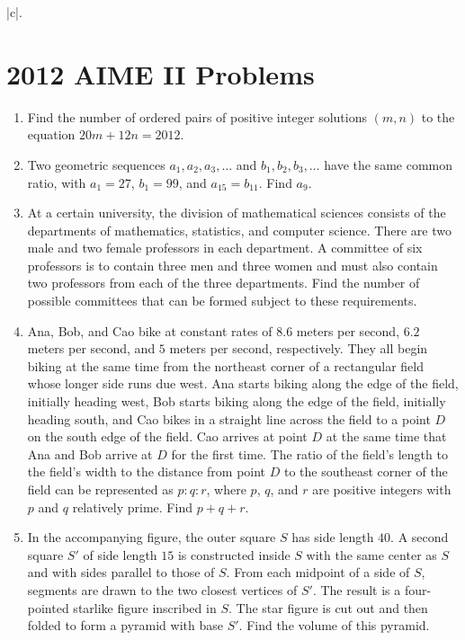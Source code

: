 \documentclass{article}
\begin{document}
\begin{enumerate}[label=\arabic*., itemsep=0.5em]
|c|\).\par \vspace{0.5em}\end{enumerate}\newpage\section*{2012 AIME II Problems}
\begin{enumerate}[label=\arabic*., itemsep=0.5em]\item Find the number of ordered pairs of positive integer solutions \((m, n)\) to the equation \(20m + 12n = 2012\).\par \vspace{0.5em}\item Two geometric sequences \(a_1, a_2, a_3, \ldots\) and \(b_1, b_2, b_3, \ldots\) have the same common ratio, with \(a_1 = 27\), \(b_1=99\), and \(a_{15}=b_{11}\). Find \(a_9\).\par \vspace{0.5em}\item At a certain university, the division of mathematical sciences consists of the departments of mathematics, statistics, and computer science. There are two male and two female professors in each department. A committee of six professors is to contain three men and three women and must also contain two professors from each of the three departments. Find the number of possible committees that can be formed subject to these requirements.\par \vspace{0.5em}\item Ana, Bob, and Cao bike at constant rates of \(8.6\) meters per second, \(6.2\) meters per second, and \(5\) meters per second, respectively. They all begin biking at the same time from the northeast corner of a rectangular field whose longer side runs due west. Ana starts biking along the edge of the field, initially heading west, Bob starts biking along the edge of the field, initially heading south, and Cao bikes in a straight line across the field to a point \(D\) on the south edge of the field. Cao arrives at point \(D\) at the same time that Ana and Bob arrive at \(D\) for the first time. The ratio of the field's length to the field's width to the distance from point \(D\) to the southeast corner of the field can be represented as \(p : q : r\), where \(p\), \(q\), and \(r\) are positive integers with \(p\) and \(q\) relatively prime. Find \(p+q+r\).\par \vspace{0.5em}\item In the accompanying figure, the outer square \(S\) has side length \(40\). A second square \(S'\) of side length \(15\) is constructed inside \(S\) with the same center as \(S\) and with sides parallel to those of \(S\). From each midpoint of a side of \(S\), segments are drawn to the two closest vertices of \(S'\). The result is a four-pointed starlike figure inscribed in \(S\). The star figure is cut out and then folded to form a pyramid with base \(S'\). Find the volume of this pyramid.


\end{enumerate}
\end{document}
